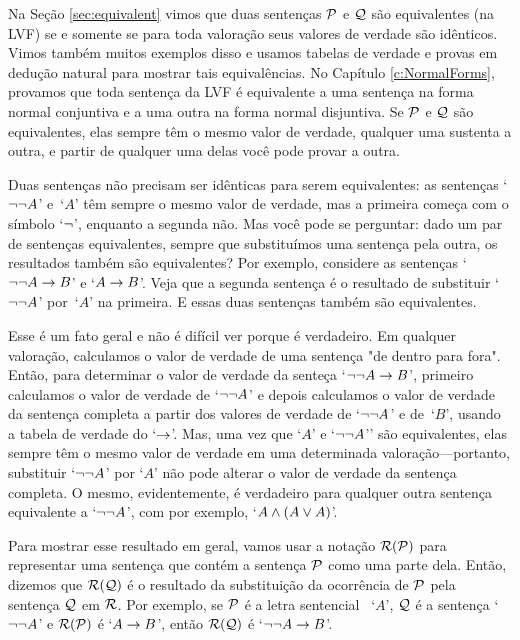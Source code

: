 Na  Seção \ref{sec:equivalent} vimos que duas sentenças $\mathcal{P}$ e $\mathcal{Q}$ são equivalentes (na LVF) se e somente se para toda valoração seus valores de verdade são idênticos.  Vimos também muitos exemplos disso e usamos tabelas de verdade e provas em dedução natural para mostrar tais equivalências.  No Capítulo \ref{c:NormalForms},  provamos que toda sentença da LVF é equivalente a uma sentença na forma normal conjuntiva  e a uma outra na forma normal disjuntiva.  Se $\mathcal{P}$ e $\mathcal{Q}$ são equivalentes,  elas sempre têm o mesmo valor de verdade, qualquer uma sustenta a outra, e partir de qualquer uma delas você pode provar a outra.


Duas sentenças não precisam ser idênticas para serem equivalentes: as sentenças `$\neg\neg A$' e~`$A$'  têm sempre o mesmo valor de verdade, mas a primeira começa com o símbolo `$\neg$', enquanto a segunda não.  Mas você pode se perguntar:  dado um par de sentenças equivalentes, sempre que substituímos uma sentença pela outra, os resultados também são equivalentes? Por exemplo, considere as sentenças  `$\neg\neg A \rightarrow B$' e `$A \rightarrow B$'.  Veja que a segunda sentença é o resultado de substituir  `$\neg\neg A$' por~`$A$' na primeira. E essas duas sentenças também são equivalentes.

Esse é um fato geral e não é difícil ver porque é verdadeiro. Em qualquer valoração, calculamos o valor de verdade de uma sentença "de dentro para fora".   Então, para determinar o valor de verdade da senteça `$\neg\neg A \rightarrow B$',  primeiro calculamos o valor de verdade de  `$\neg\neg A$' e depois calculamos o valor de verdade da sentença completa a partir dos valores  de verdade de `$\neg\neg A$’ e de~`$B$’, usando a tabela de verdade do `$\rightarrow$’. 
Mas, uma vez que `$A$'  e  `$\neg\neg A$'' são equivalentes, elas sempre têm o mesmo valor de verdade em uma determinada valoração---portanto, substituir `$\neg\neg A$' por `$A$' não pode alterar o valor de verdade da sentença completa. O mesmo, evidentemente, é verdadeiro para qualquer outra sentença equivalente a `$\neg\neg A$', com por exemplo, `$A \wedge (A \vee A)$'.

Para mostrar esse resultado em geral, vamos usar a notação $\mathcal{R}(\mathcal{P})$ para representar uma sentença que contém a sentença $\mathcal{P}$ como uma parte dela. Então,  dizemos que $\mathcal{R}(\mathcal{Q})$ é o resultado da substituição da ocorrência de $\mathcal{P}$ pela sentença $\mathcal{Q}$  em $\mathcal{R}$.  Por exemplo, se $\mathcal{P}$ é a letra sentencial ~`$A$', $\mathcal{Q}$ é a sentença `$\neg\neg A$' e $\mathcal{R}(\mathcal{P})$  é  `$A \rightarrow B$', então $\mathcal{R}(\mathcal{Q})$  é `$\neg\neg A \rightarrow B$’.

